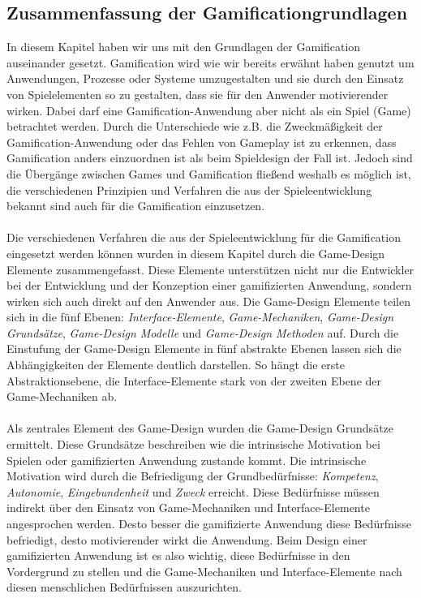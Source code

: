 \documentclass[a4paper,12pt,twoside]{scrartcl}
\begin{document}
\subsection{Zusammenfassung der Gamificationgrundlagen}
In diesem Kapitel haben wir uns mit den Grundlagen der Gamification auseinander gesetzt. Gamification wird wie wir bereits erwähnt haben genutzt um Anwendungen, Prozesse oder Systeme umzugestalten und sie durch den Einsatz von Spielelementen so zu gestalten, dass sie für den Anwender motivierender wirken. Dabei darf eine Gamification-Anwendung aber nicht als ein Spiel (Game) betrachtet werden. Durch die Unterschiede wie z.B. die Zweckmäßigkeit der Gamification-Anwendung oder das Fehlen von Gameplay ist zu erkennen, dass Gamification anders einzuordnen ist als beim Spieldesign der Fall ist. Jedoch sind die Übergänge zwischen Games und Gamification fließend weshalb es möglich ist, die verschiedenen Prinzipien und Verfahren die aus der Spieleentwicklung bekannt sind auch für die Gamification einzusetzen.
\\\\
Die verschiedenen Verfahren die aus der Spieleentwicklung für die Gamification eingesetzt werden können wurden in diesem Kapitel durch die Game-Design Elemente zusammengefasst. Diese Elemente unterstützen nicht nur die Entwickler bei der Entwicklung und der Konzeption einer gamifizierten Anwendung, sondern wirken sich auch direkt auf den Anwender aus. Die Game-Design Elemente teilen sich in die fünf Ebenen: \textit{Interface-Elemente}, \textit{Game-Mechaniken}, \textit{Game-Design Grundsätze}, \textit{Game-Design Modelle} und \textit{Game-Design Methoden} auf. Durch die Einstufung der Game-Design Elemente in fünf abstrakte Ebenen lassen sich die Abhängigkeiten der Elemente deutlich darstellen. So hängt die erste Abstraktionsebene, die Interface-Elemente stark von der zweiten Ebene der Game-Mechaniken ab.
\\\\
Als zentrales Element des Game-Design wurden die Game-Design Grundsätze ermittelt. Diese Grundsätze beschreiben wie die intrinsische Motivation bei Spielen oder gamifizierten Anwendung zustande kommt. Die intrinsische Motivation wird durch  die Befriedigung der Grundbedürfnisse: \textit{Kompetenz}, \textit{Autonomie}, \textit{Eingebundenheit} und \textit{Zweck} erreicht. Diese Bedürfnisse müssen indirekt über den Einsatz von Game-Mechaniken und Interface-Elemente angesprochen werden. Desto besser die gamifizierte Anwendung diese Bedürfnisse befriedigt, desto motivierender wirkt die Anwendung. Beim Design einer gamifizierten Anwendung ist es also wichtig, diese Bedürfnisse in den Vordergrund zu stellen und die Game-Mechaniken und Interface-Elemente nach diesen menschlichen Bedürfnissen auszurichten.
\end{document}
